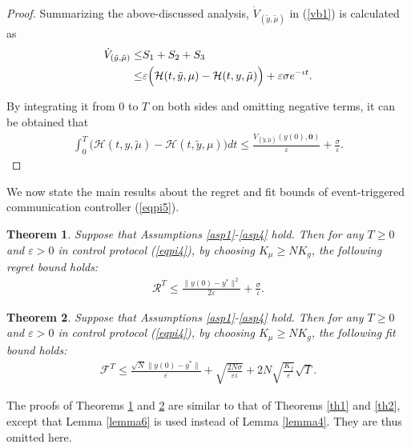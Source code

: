 \documentclass[letterpaper, 10 pt, conference]{ieeeconf}  %
\newtheorem{theorem}{ {Theorem}}
\begin{document}
\begin{proof}
	Summarizing the above-discussed analysis,	$\dot{V}_{(\tilde{y}, \tilde{\mu})}$ in (\ref{vb1}) is calculated as
	\begin{align}
		\dot{V}_{(\tilde{y}, \tilde{\mu})}
		\le
		&S_{1}+S_{2}+S_{3}\notag\\
		\le
		& \varepsilon \Big(\mathcal{H}(t,\tilde{y},\mu) - \mathcal{H}(t,y,\tilde{\mu})\Big) + \varepsilon\sigma e^{-\iota t}.\notag
	\end{align}

	By integrating it from $0$ to $T$ on both sides and omitting negative terms, it can be obtained that
	\begin{align}
		\int_{0}^{T} \Big( \mathcal{H}(t,y,\tilde{\mu}){-}\mathcal{H}(t,\tilde{y},\mu)\Big) dt {\le} \frac{V_{(\tilde{y}, \tilde{\mu})}(y(0), \boldsymbol{0})}{\varepsilon} {+} \frac{\sigma}{\iota}.
	\end{align}
\end{proof}

We now state the main results about the regret and fit bounds of event-triggered communication controller (\ref{eqpi5}).

\begin{theorem}\label{th3}
	Suppose that Assumptions \ref{asp1}-\ref{asp4} hold. Then for any $T\ge0$ and $\varepsilon>0$ in control protocol (\ref{eqpi4}), by choosing $K_\mu \ge NK_g$, the following regret bound holds:
	\begin{align}
		\mathcal{R}^T\le \frac{\|y(0)\!-\!y^*\|^2}{2\varepsilon} +\frac{\sigma}{\iota}.
	\end{align}
\end{theorem}

\begin{theorem}\label{th4}	
	Suppose that Assumptions \ref{asp1}-\ref{asp4} hold. Then for any $T\ge0$ and $\varepsilon>0$ in control protocol (\ref{eqpi4}), by choosing $K_\mu \ge NK_g$, the following fit bound holds:
	\begin{align}
		\mathcal{F}^T\le \frac{\sqrt{N}\|y(0)-y^*\|}{\varepsilon}  + \sqrt{\frac{2N\sigma}{\varepsilon\iota}} + 2N\sqrt{\frac{K_f}{\varepsilon}}\sqrt{T}.
	\end{align}
	
\end{theorem}

The proofs of Theorems \ref{th3} and \ref{th4} are similar to that of Theorems \ref{th1} and \ref{th2}, except that Lemma \ref{lemma6} is used instead of Lemma \ref{lemma4}. They are thus omitted here.
\end{document}
